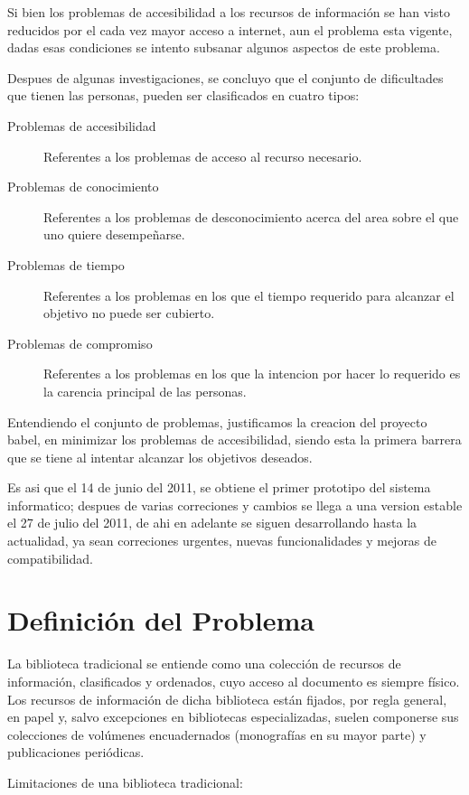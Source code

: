 \documentclass[letter,12pt]{article}
\begin{document}
Si bien los problemas de accesibilidad a los recursos de información se han visto reducidos por el
cada vez mayor acceso a internet, aun el problema esta vigente, dadas esas condiciones se intento
subsanar algunos aspectos de este problema.

Despues de algunas investigaciones, se concluyo que el conjunto de dificultades que tienen las
personas, pueden ser clasificados en cuatro tipos:

\begin{description}
\item [Problemas de accesibilidad] Referentes a los problemas de acceso al recurso necesario.
\item [Problemas de conocimiento] Referentes a los problemas de desconocimiento acerca del area 
sobre el que uno quiere desempeñarse.
\item [Problemas de tiempo] Referentes a los problemas en los que el tiempo requerido para alcanzar
el objetivo no puede ser cubierto.
\item [Problemas de compromiso] Referentes a los problemas en los que la intencion por hacer lo
requerido es la carencia principal de las personas.
\end{description}

Entendiendo el conjunto de problemas, justificamos la creacion del proyecto babel, en minimizar los
problemas de accesibilidad, siendo esta la primera barrera que se tiene al intentar alcanzar los
objetivos deseados.

Es asi que el 14 de junio del 2011, se obtiene el primer prototipo del sistema informatico; despues
de varias correciones y cambios se llega a una version estable el 27 de julio del 2011, de ahi en
adelante se siguen desarrollando hasta la actualidad, ya sean correciones urgentes, nuevas
funcionalidades y mejoras de compatibilidad.

\section{Definición del Problema}
La biblioteca tradicional se entiende como una colección de recursos de información, clasificados
y ordenados, cuyo acceso al documento es siempre físico. Los recursos de información de dicha
biblioteca están fijados, por regla general, en papel y, salvo excepciones en bibliotecas
especializadas, suelen componerse sus colecciones de volúmenes encuadernados (monografías en su
mayor parte) y publicaciones periódicas.

Limitaciones de una biblioteca tradicional:
\end{document}
